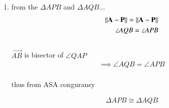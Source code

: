 \begin{enumerate}[label=\thesection.\arabic*.,ref=\thesection.\theenumi]

%
\item from the $\Delta APB$ and $\Delta{AQB}$... 
%
\begin{align}
\left\lVert\mathbf{A-P}\right\rVert = \left\lVert\mathbf{A-P}\right\rVert
\\
\angle{AQB} = \angle{APB}
\end{align}
\\
$\vec{AB}$ is bisector of $\angle QAP$
\begin{align}
\implies\angle{AQB} = \angle{APB}
\end{align}
\\
thus from ASA conguransy
 
 \begin{align}
 \Delta APB \cong \Delta AQB
 \end{align}
\end{enumerate}
